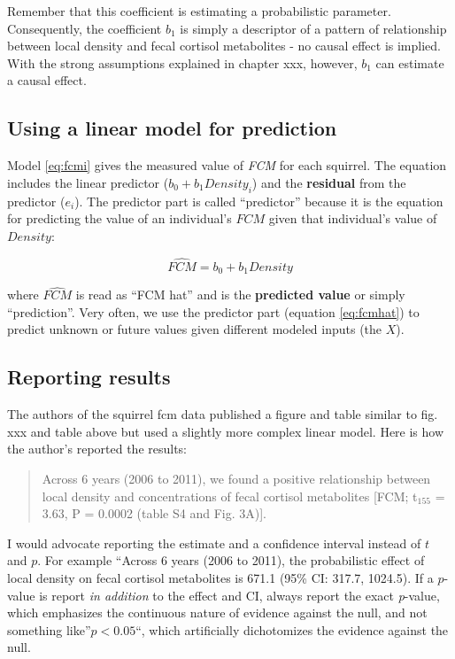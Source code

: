 \documentclass[]{book}
\theoremstyle{definition}
\theoremstyle{definition}
\theoremstyle{definition}
\theoremstyle{remark}
\begin{document}
Remember that this coefficient is estimating a probabilistic parameter.
Consequently, the coefficient \(b_1\) is simply a descriptor of a
pattern of relationship between local density and fecal cortisol
metabolites - no causal effect is implied. With the strong assumptions
explained in chapter xxx, however, \(b_1\) can estimate a causal effect.

\subsection{Using a linear model for
prediction}\label{using-a-linear-model-for-prediction}

Model \eqref{eq:fcmi} gives the measured value of \emph{FCM} for each
squirrel. The equation includes the linear predictor
(\(b_0 + b_1 Density_i\)) and the \textbf{residual} from the predictor
(\(e_i\)). The predictor part is called ``predictor'' because it is the
equation for predicting the value of an individual's \(FCM\) given that
individual's value of \(Density\):

\begin{equation}
\widehat{FCM} = b_0 + b_1 Density
\label{eq:fcmhat}
\end{equation}

where \(\widehat{FCM}\) is read as ``FCM hat'' and is the
\textbf{predicted value} or simply ``prediction''. Very often, we use
the predictor part (equation \eqref{eq:fcmhat}) to predict unknown or
future values given different modeled inputs (the \(X\)).

\subsection{Reporting results}\label{reporting-results}

The authors of the squirrel fcm data published a figure and table
similar to fig. xxx and table above but used a slightly more complex
linear model. Here is how the author's reported the results:

\begin{quote}
Across 6 years (2006 to 2011), we found a positive relationship between
local density and concentrations of fecal cortisol metabolites {[}FCM;
t\(_155\) = 3.63, P = 0.0002 (table S4 and Fig. 3A){]}.
\end{quote}

I would advocate reporting the estimate and a confidence interval
instead of \(t\) and \(p\). For example ``Across 6 years (2006 to 2011),
the probabilistic effect of local density on fecal cortisol metabolites
is 671.1 (95\% CI: 317.7, 1024.5). If a \(p\)-value is report \emph{in
addition} to the effect and CI, always report the exact \emph{p}-value,
which emphasizes the continuous nature of evidence against the null, and
not something like''\(p < 0.05\)``, which artificially dichotomizes the
evidence against the null.
\end{document}
